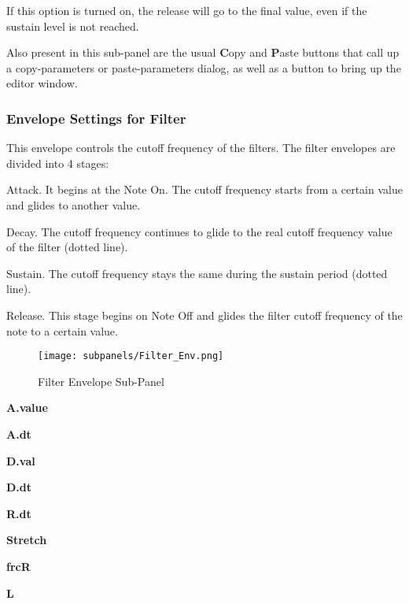    If this option is turned on, the release will go to the
   final value, even if the sustain level is not reached.

   Also present in this sub-panel are the usual \textbf{C}opy
   and \textbf{P}aste buttons that call up a copy-parameters or
   paste-parameters dialog, as well as a button
   to bring up the editor window.

\subsubsection{Envelope Settings for Filter}
\label{subsubsec:envelope_settings_for_filter}

   This envelope controls the cutoff frequency of the filters.
   The filter envelopes are divided into 4 stages:


   \begin{enumber}
      \item Attack.
         It begins at the Note On.
         The cutoff frequency starts from a certain value and glides to another
         value.
      \item Decay.
         The cutoff frequency continues to glide to the real cutoff frequency
         value of the filter (dotted line).
      \item Sustain.
         The cutoff frequency stays the same during the sustain period (dotted
         line).
      \item Release.
         This stage begins on Note Off and glides the filter cutoff frequency
         of the note to a certain value.
   \end{enumber}

\begin{figure}[H]
   \centering 
   \texttt{[image: subpanels/Filter\_Env.png]}
   \caption[Filter Envelope Sub-Panel]{Filter Envelope Sub-Panel}
   \label{fig:filter_env}
\end{figure}

   \begin{enumber}
      \item \textbf{A.value}
      \item \textbf{A.dt}
      \item \textbf{D.val}
      \item \textbf{D.dt}
      \item \textbf{R.dt}
      \item \textbf{Stretch}
      \item \textbf{frcR}
      \item \textbf{L}
   \end{enumber}

